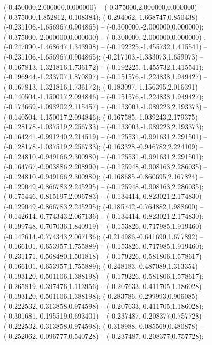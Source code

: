  (-0.450000,2.000000,0.000000) -- (-0.375000,2.000000,0.000000) -- (-0.375000,1.852812,-0.108384);
 (-0.294062,-1.668747,0.850438) -- (-0.231106,-1.656967,0.904865) -- (-0.300000,-2.000000,0.000000);
 (-0.375000,-2.000000,0.000000) -- (-0.300000,-2.000000,0.000000) ;
 (-0.247090,-1.468647,1.343998) -- (-0.192225,-1.455732,1.415541) -- (-0.231106,-1.656967,0.904865);
 (-0.217103,-1.333073,1.659073) -- (-0.167813,-1.321816,1.736172) -- (-0.192225,-1.455732,1.415541);
 (-0.196944,-1.233707,1.870897) -- (-0.151576,-1.224838,1.949427) -- (-0.167813,-1.321816,1.736172);
 (-0.183097,-1.156395,2.016391) -- (-0.140504,-1.150017,2.094846) -- (-0.151576,-1.224838,1.949427);
 (-0.173669,-1.093202,2.115457) -- (-0.133003,-1.089223,2.193373) -- (-0.140504,-1.150017,2.094846);
 (-0.167585,-1.039243,2.179375) -- (-0.128178,-1.037519,2.256733) -- (-0.133003,-1.089223,2.193373);
 (-0.164241,-0.991240,2.214519) -- (-0.125531,-0.991631,2.291501) -- (-0.128178,-1.037519,2.256733);
 (-0.163328,-0.946782,2.224109) -- (-0.124810,-0.949166,2.300980) -- (-0.125531,-0.991631,2.291501);
 (-0.164767,-0.903886,2.208990) -- (-0.125948,-0.908163,2.286035) -- (-0.124810,-0.949166,2.300980);
 (-0.168685,-0.860695,2.167824) -- (-0.129049,-0.866783,2.245295) -- (-0.125948,-0.908163,2.286035);
 (-0.175446,-0.815197,2.096783) -- (-0.134414,-0.823021,2.174830) -- (-0.129049,-0.866783,2.245295);
 (-0.185742,-0.764882,1.988600) -- (-0.142614,-0.774343,2.067136) -- (-0.134414,-0.823021,2.174830);
 (-0.199748,-0.707036,1.840919) -- (-0.153826,-0.717985,1.919460) -- (-0.142614,-0.774343,2.067136);
 (-0.214986,-0.641690,1.677892) -- (-0.166101,-0.653957,1.755889) -- (-0.153826,-0.717985,1.919460);
 (-0.231171,-0.568480,1.501818) -- (-0.179226,-0.581806,1.578617) -- (-0.166101,-0.653957,1.755889);
 (-0.248183,-0.487089,1.313354) -- (-0.193120,-0.501106,1.388198) -- (-0.179226,-0.581806,1.578617);
 (-0.265819,-0.397476,1.113956) -- (-0.207633,-0.411705,1.186028) -- (-0.193120,-0.501106,1.388198);
 (-0.283786,-0.299993,0.906085) -- (-0.222532,-0.313858,0.974598) -- (-0.207633,-0.411705,1.186028);
 (-0.301681,-0.195519,0.693401) -- (-0.237487,-0.208377,0.757728) -- (-0.222532,-0.313858,0.974598);
 (-0.318988,-0.085569,0.480878) -- (-0.252062,-0.096777,0.540728) -- (-0.237487,-0.208377,0.757728);
